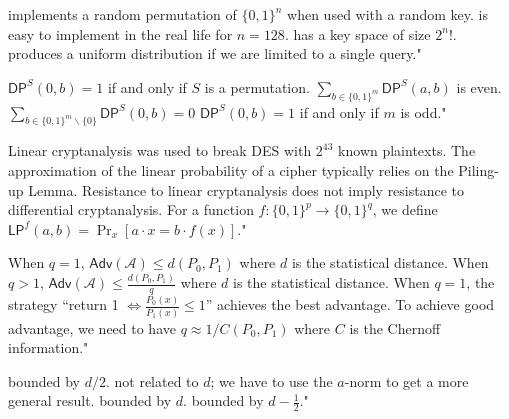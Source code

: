 {implements a random permutation of $\{0,1\}^n$ when used with a random key.}
{is easy to implement in the real life for $n=128$.}
{has a key space of size $2^n!$.}
{produces a uniform distribution if we are limited to a single query."}

{$\mathsf{DP}^S(0,b)=1$ if and only if $S$ is a permutation.}
{$\sum_{b\in \{0,1\}^m} \mathsf{DP}^S(a,b)$ is even.}
{$\sum_{b\in \{0,1\}^m \backslash \{0\}} \mathsf{DP}^S(0,b)= 0$}
{$\mathsf{DP}^S(0,b)=1$ if and only if $m$ is odd."}

{Linear cryptanalysis was used to break DES with $2^{43}$ known plaintexts.}
{The approximation of the linear probability of a cipher typically relies on the Piling-up Lemma.}
{Resistance to linear cryptanalysis does not imply resistance to differential cryptanalysis.}
{For a function $f:\{0,1\}^p \rightarrow \{0,1\}^q$, we define $\mathsf{LP}^f(a,b) = \Pr_x[a\cdot x = b\cdot f(x)]$."}

{When $q=1$, $\mathsf{Adv}(\mathcal{A})\leq d(P_0,P_1)$ where $d$ is the statistical distance.}
{When $q>1$, $\mathsf{Adv}(\mathcal{A})\leq \frac{d(P_0,P_1)}{q}$ where $d$ is the statistical distance.}
{When $q=1$, the strategy ``return 1 $\Leftrightarrow \frac{P_0(x)}{P_1(x)}\leq 1$'' achieves the best advantage.}
{To achieve good advantage, we need to have $q\approx 1/C(P_0,P_1)$ where $C$ is the Chernoff information."}

{bounded by $d/2$.}
{not related to $d$; we have to use the $a$-norm to get a more general result.}
{bounded by $d$.}
{bounded by $d-\frac{1}{2}$."}

